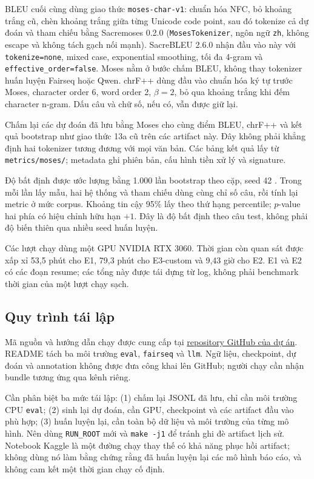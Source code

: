 \documentclass[11pt,twocolumn]{article}
\begin{document}
BLEU cuối cùng dùng giao thức \texttt{moses-char-v1}: chuẩn hóa NFC,
bỏ khoảng trắng cũ, chèn khoảng trắng giữa từng Unicode code point, sau đó
tokenize cả dự đoán và tham chiếu bằng Sacremoses 0.2.0
(\texttt{MosesTokenizer}, ngôn ngữ \texttt{zh}, không escape và không tách
gạch nối mạnh). SacreBLEU 2.6.0 nhận đầu vào này với
\texttt{tokenize=none}, mixed case, exponential smoothing, tối đa 4-gram
và \texttt{effective\_order=false}. Moses nằm ở bước chấm BLEU,
không thay tokenizer huấn luyện Fairseq hoặc Qwen.
chrF++ dùng đầu vào chuẩn hóa ký tự trước Moses, character order 6,
word order 2, $\beta=2$, bỏ qua khoảng trắng khi đếm character n-gram.
Dấu câu và chữ số, nếu có, vẫn được giữ lại.

Chấm lại các dự đoán đã lưu bằng Moses cho cùng điểm BLEU, chrF++ và
kết quả bootstrap như giao thức 13a cũ trên các artifact này.
Đây không phải khẳng định hai tokenizer tương đương với mọi văn bản.
Các bảng kết quả lấy từ \texttt{metrics/moses/}; metadata ghi phiên bản,
cấu hình tiền xử lý và signature.

Độ bất định được ước lượng bằng 1.000 lần bootstrap theo cặp, seed 42
\citep{koehn2004statistical}. Trong mỗi lần lấy mẫu, hai hệ thống và tham
chiếu dùng cùng chỉ số câu, rồi tính lại metric ở mức corpus.
Khoảng tin cậy 95\% lấy theo thứ hạng percentile; $p$-value hai phía
có hiệu chỉnh hữu hạn $+1$. Đây là độ bất định theo câu test,
không phải độ biến thiên qua nhiều seed huấn luyện.

Các lượt chạy dùng một GPU NVIDIA RTX 3060. Thời gian còn quan sát được
xấp xỉ 53,5 phút cho E1, 79,3 phút cho E3-custom và 9,43 giờ cho E2.
E1 và E2 có các đoạn resume; các tổng này được tái dựng từ log,
không phải benchmark thời gian của một lượt chạy sạch.

\subsection{Quy trình tái lập}

Mã nguồn và hướng dẫn chạy được cung cấp tại
\href{https://github.com/ngnquanq/nlp_project}{repository GitHub của dự án}.
README tách ba môi trường \texttt{eval}, \texttt{fairseq} và \texttt{llm}.
Ngữ liệu, checkpoint, dự đoán và annotation không được đưa công khai lên
GitHub; người chạy cần nhận bundle tương ứng qua kênh riêng.

Cần phân biệt ba mức tái lập: (1) chấm lại JSONL đã lưu, chỉ cần môi trường
CPU \texttt{eval}; (2) sinh lại dự đoán, cần GPU, checkpoint và các artifact
đầu vào phù hợp; (3) huấn luyện lại, cần toàn bộ dữ liệu và môi trường của
từng mô hình. Nên dùng \texttt{RUN\_ROOT} mới và \texttt{make -j1} để tránh
ghi đè artifact lịch sử. Notebook Kaggle là một đường chạy thay thế có
khả năng phục hồi artifact; không dùng nó làm bằng chứng rằng đã huấn luyện
lại các mô hình báo cáo, và không cam kết một thời gian chạy cố định.
\end{document}
